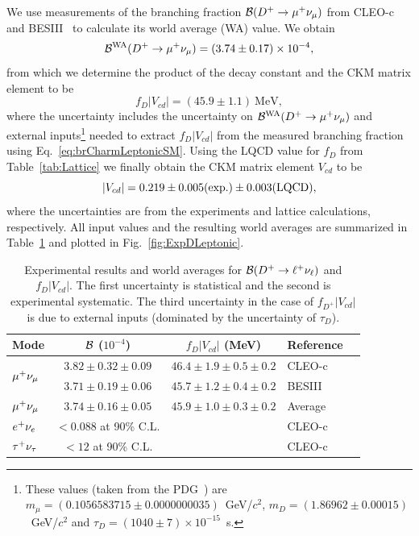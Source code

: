 We use measurements of the branching fraction ${\cal B}(D^+\to\mu^+\nu_{\mu})$ from \mbox{CLEO-c}~\cite{Eisenstein:2008aa} and 
BESIII~\cite{Ablikim:2013uvu} to calculate its world average (WA) value. We obtain
\begin{equation}
 {\cal B}^{\rm WA}(D^+\to\mu^+\nu_{\mu}) = (3.74\pm0.17)\times10^{-4},
 \label{eq:Br:WA:DtoMuNu}
\end{equation}
from which we determine the product of the decay constant and the CKM matrix element to be
\begin{equation}
 f_{D}|V_{cd}| = \left(45.9\pm1.1\right)~\mbox{MeV},
 \label{eq:expFDVCD}
\end{equation}
where the uncertainty includes the uncertainty on ${\cal B}^{\rm WA}(D^+\to\mu^+\nu_{\mu})$ and external inputs\footnote{These values (taken from the PDG~\cite{PDG_2012}) are
$m_{\mu} = (0.1056583715\pm0.0000000035)$~GeV/$c^2$, $m_D = (1.86962\pm0.00015)$~GeV/$c^2$ 
and $\tau_D = (1040\pm7)\times 10^{-15}$~s.} needed to extract $f_{D}|V_{cd}|$ from the 
measured branching fraction using Eq.~\ref{eq:brCharmLeptonicSM}. 
Using the LQCD value for $f_D$ from Table~\ref{tab:Lattice} we 
finally obtain the CKM matrix element $V_{cd}$ to be
\begin{equation}
 |V_{cd}| = 0.219\pm0.005(\rm exp.)\pm0.003(\rm LQCD),
 \label{eq:Vcd:WA:Leptonic}
\end{equation}
where the uncertainties are from the experiments and lattice calculations, respectively. All input values
and the resulting world averages are summarized in Table~\ref{tab:DExpLeptonic} and plotted in 
Fig.~\ref{fig:ExpDLeptonic}.
\begin{table}[t!]
\caption{Experimental results and world averages for ${\cal{B}}(D^+\to \ell^+\nu_{\ell})$ and $f_{D}|V_{cd}|$.
The first uncertainty is statistical and the second is experimental systematic. The third uncertainty in the case
of $f_{D^+}|V_{cd}|$ is due to external inputs (dominated by the uncertainty of $\tau_D$).
\label{tab:DExpLeptonic}}
\begin{center}
\begin{tabular}{lccll}
\toprule
\rowcolor{Gray} Mode 	& ${\cal{B}}$ ($10^{-4}$)	& $f_{D}|V_{cd}|$ (MeV)		& Reference & \\ 
\midrule
\multirow{2}{*}{$\mu^+\nu_{\mu}$} & $3.82\pm0.32\pm 0.09$ 	& $46.4\pm1.9\pm0.5\pm0.2$	& CLEO-c & \cite{Eisenstein:2008aa}\\ 
			& $3.71\pm0.19\pm 0.06$ 	& $45.7\pm1.2\pm0.4\pm0.2$	& BESIII & \cite{Ablikim:2013uvu}\\
\midrule
\rowcolor{Gray}$\mu^+\nu_{\mu}$ 	& $3.74\pm0.16\pm 0.05$		& $45.9\pm1.0\pm0.3\pm0.2$	& Average & \\
\midrule
$e^+\nu_{e}$	 		& {$<0.088$ at 90\% C.L.}	&& CLEO-c & \cite{Eisenstein:2008aa}\\
\midrule
$\tau^+\nu_{\tau}$ 		& {$<12$ at 90\% C.L.}		&& CLEO-c & \cite{Eisenstein:2008aa}
\\ \bottomrule
\end{tabular}
\end{center}
\end{table}
